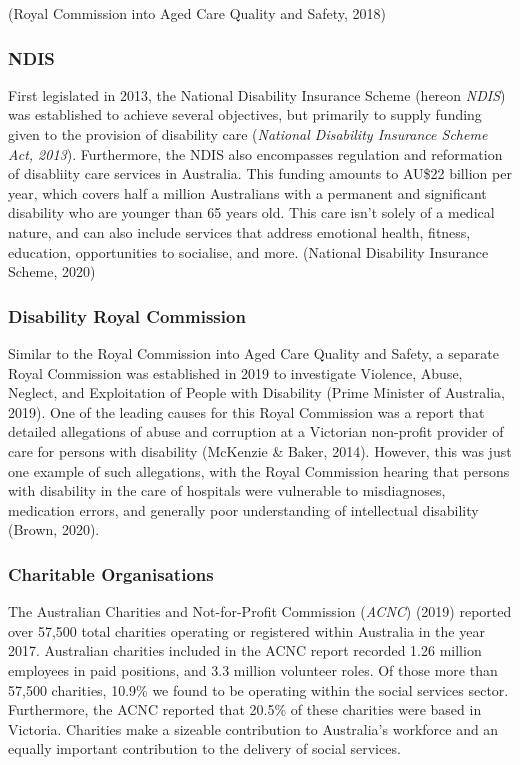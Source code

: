 \documentclass[
  11pt,
]{article}
\begin{document}
(Royal Commission into Aged Care Quality and Safety, 2018)

\hypertarget{ndis}{%
\subsubsection{NDIS}\label{ndis}}

First legislated in 2013, the National Disability Insurance Scheme (hereon \emph{NDIS}) was established to achieve several objectives, but primarily to supply funding given to the provision of disability care (\emph{National Disability Insurance Scheme Act, 2013}). Furthermore, the NDIS also encompasses regulation and reformation of disabliity care services in Australia. This funding amounts to AU\$22 billion per year, which covers half a million Australians with a permanent and significant disability who are younger than 65 years old. This care isn't solely of a medical nature, and can also include services that address emotional health, fitness, education, opportunities to socialise, and more. (National Disability Insurance Scheme, 2020)

\hypertarget{disability-royal-commission}{%
\subsubsection{Disability Royal Commission}\label{disability-royal-commission}}

Similar to the Royal Commission into Aged Care Quality and Safety, a separate Royal Commission was established in 2019 to investigate Violence, Abuse, Neglect, and Exploitation of People with Disability (Prime Minister of Australia, 2019). One of the leading causes for this Royal Commission was a report that detailed allegations of abuse and corruption at a Victorian non-profit provider of care for persons with disability (McKenzie \& Baker, 2014). However, this was just one example of such allegations, with the Royal Commission hearing that persons with disability in the care of hospitals were vulnerable to misdiagnoses, medication errors, and generally poor understanding of intellectual disability (Brown, 2020).

\hypertarget{charitable-organisations}{%
\subsubsection{Charitable Organisations}\label{charitable-organisations}}

The Australian Charities and Not-for-Profit Commission (\emph{ACNC}) (2019) reported over 57,500 total charities operating or registered within Australia in the year 2017. Australian charities included in the ACNC report recorded 1.26 million employees in paid positions, and 3.3 million volunteer roles. Of those more than 57,500 charities, 10.9\% we found to be operating within the social services sector. Furthermore, the ACNC reported that 20.5\% of these charities were based in Victoria. Charities make a sizeable contribution to Australia's workforce and an equally important contribution to the delivery of social services.
\end{document}
